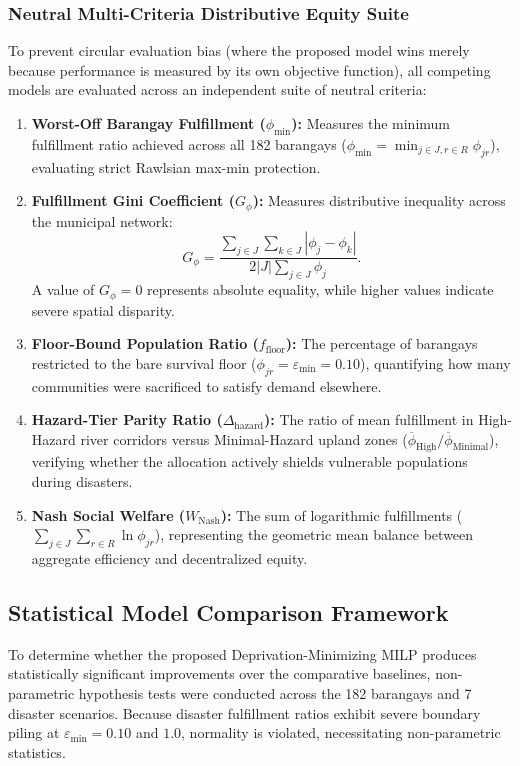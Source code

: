 \subsubsection{Neutral Multi-Criteria Distributive Equity Suite}
To prevent circular evaluation bias (where the proposed model wins merely because performance is measured by its own objective function), all competing models are evaluated across an independent suite of neutral criteria:
\begin{enumerate}
    \item \textbf{Worst-Off Barangay Fulfillment ($\phi_{\min}$):} Measures the minimum fulfillment ratio achieved across all 182 barangays ($\phi_{\min} = \min_{j \in J, r \in R} \phi_{jr}$), evaluating strict Rawlsian max-min protection.
    \item \textbf{Fulfillment Gini Coefficient ($G_\phi$):} Measures distributive inequality across the municipal network:
    \begin{equation}
        G_\phi = \frac{\sum_{j \in J} \sum_{k \in J} |\phi_j - \phi_k|}{2 |J| \sum_{j \in J} \phi_j}.
    \end{equation}
    A value of $G_\phi = 0$ represents absolute equality, while higher values indicate severe spatial disparity.
    \item \textbf{Floor-Bound Population Ratio ($f_{\text{floor}}$):} The percentage of barangays restricted to the bare survival floor ($\phi_{jr} = \varepsilon_{\min} = 0.10$), quantifying how many communities were sacrificed to satisfy demand elsewhere.
    \item \textbf{Hazard-Tier Parity Ratio ($\Delta_{\text{hazard}}$):} The ratio of mean fulfillment in High-Hazard river corridors versus Minimal-Hazard upland zones ($\overline{\phi}_{\text{High}} / \overline{\phi}_{\text{Minimal}}$), verifying whether the allocation actively shields vulnerable populations during disasters.
    \item \textbf{Nash Social Welfare ($W_{\text{Nash}}$):} The sum of logarithmic fulfillments ($\sum_{j \in J} \sum_{r \in R} \ln \phi_{jr}$), representing the geometric mean balance between aggregate efficiency and decentralized equity.
\end{enumerate}



\subsection{Statistical Model Comparison Framework}
\label{sec:statistical_tests}
To determine whether the proposed Deprivation-Minimizing MILP produces statistically significant improvements over the comparative baselines, non-parametric hypothesis tests were conducted across the 182 barangays and 7 disaster scenarios. Because disaster fulfillment ratios exhibit severe boundary piling at $\varepsilon_{\min} = 0.10$ and $1.0$, normality is violated, necessitating non-parametric statistics.

